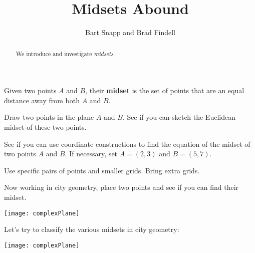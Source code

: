 \documentclass[nooutcomes]{ximera}
\title{Midsets Abound}
\author{Bart Snapp and Brad Findell}
\begin{document}
\begin{abstract}
  We introduce and investigate \textit{midsets}.
\end{abstract}
\maketitle

\begin{definition}
Given two points $A$ and $B$, their \textbf{midset} is the set of points that are an equal distance away from both $A$ and $B$.
\end{definition}

\begin{problem} 
Draw two points in the plane $A$ and $B$. See if you can sketch the
Euclidean midset of these two points.
\vfill
\end{problem}

\begin{problem}
See if you can use coordinate constructions to find the equation of
the midset of two points $A$ and $B$. If necessary, set $A = (2,3)$
and $B = (5,7)$.
\vfill
\end{problem}

\newpage
\begin{teachingnote}
Use specific pairs of points and smaller grids.  Bring extra grids.
\end{teachingnote}  
\begin{problem}
Now working in city geometry, place two points and see if you can find
their midset.
\begin{image}
\texttt{[image: complexPlane]}
\end{image}
\vfill
\end{problem}

\newpage
\begin{problem}
Let's try to classify the various midsets in city geometry:
\begin{image}
\texttt{[image: complexPlane]}
\end{image}
\vfill
\end{problem}
\end{document}

